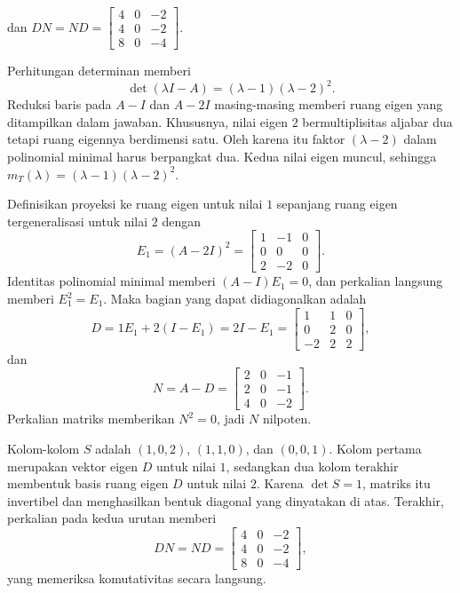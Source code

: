 \begin{o001solution}
\begin{o001answer}
\[\]
dan $DN=ND=\begin{bmatrix}4&0&-2\\4&0&-2\\8&0&-4\end{bmatrix}$.
\end{o001answer}
\begin{o001proof}
Perhitungan determinan memberi
\[
\det(\lambda I-A)=(\lambda-1)(\lambda-2)^2.
\]
Reduksi baris pada $A-I$ dan $A-2I$ masing-masing memberi ruang eigen yang
ditampilkan dalam jawaban. Khususnya, nilai eigen $2$ bermultiplisitas
aljabar dua tetapi ruang eigennya berdimensi satu. Oleh karena itu faktor
$(\lambda-2)$ dalam polinomial minimal harus berpangkat dua. Kedua nilai
eigen muncul, sehingga
$m_T(\lambda)=(\lambda-1)(\lambda-2)^2$.

Definisikan proyeksi ke ruang eigen untuk nilai $1$ sepanjang ruang eigen
tergeneralisasi untuk nilai $2$ dengan
\[
 E_1=(A-2I)^2
 =\begin{bmatrix}1&-1&0\\0&0&0\\2&-2&0\end{bmatrix}.
\]
Identitas polinomial minimal memberi $(A-I)E_1=0$, dan perkalian langsung
memberi $E_1^2=E_1$. Maka bagian yang dapat didiagonalkan adalah
\[
 D=1E_1+2(I-E_1)=2I-E_1
 =\begin{bmatrix}1&1&0\\0&2&0\\-2&2&2\end{bmatrix},
\]
dan
\[
 N=A-D
 =\begin{bmatrix}2&0&-1\\2&0&-1\\4&0&-2\end{bmatrix}.
\]
Perkalian matriks memberikan $N^2=0$, jadi $N$ nilpoten.

Kolom-kolom $S$ adalah $(1,0,2)$, $(1,1,0)$, dan $(0,0,1)$.
Kolom pertama merupakan vektor eigen $D$ untuk nilai $1$, sedangkan dua
kolom terakhir membentuk basis ruang eigen $D$ untuk nilai $2$.
Karena $\det S=1$, matriks itu invertibel dan menghasilkan bentuk diagonal
yang dinyatakan di atas. Terakhir, perkalian pada kedua urutan memberi
\[
 DN=ND=
 \begin{bmatrix}4&0&-2\\4&0&-2\\8&0&-4\end{bmatrix},
\]
yang memeriksa komutativitas secara langsung.
\end{o001proof}
\end{o001solution}

